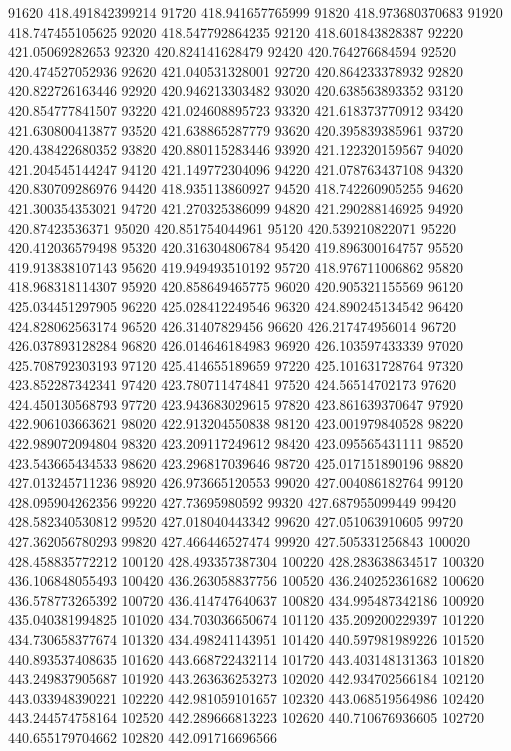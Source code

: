 {91620 418.491842399214
91720 418.941657765999
91820 418.973680370683
91920 418.747455105625
92020 418.547792864235
92120 418.601843828387
92220 421.05069282653
92320 420.824141628479
92420 420.764276684594
92520 420.474527052936
92620 421.040531328001
92720 420.864233378932
92820 420.822726163446
92920 420.946213303482
93020 420.638563893352
93120 420.854777841507
93220 421.024608895723
93320 421.618373770912
93420 421.630800413877
93520 421.638865287779
93620 420.395839385961
93720 420.438422680352
93820 420.880115283446
93920 421.122320159567
94020 421.204545144247
94120 421.149772304096
94220 421.078763437108
94320 420.830709286976
94420 418.935113860927
94520 418.742260905255
94620 421.300354353021
94720 421.270325386099
94820 421.290288146925
94920 420.87423536371
95020 420.851754044961
95120 420.539210822071
95220 420.412036579498
95320 420.316304806784
95420 419.896300164757
95520 419.913838107143
95620 419.949493510192
95720 418.976711006862
95820 418.968318114307
95920 420.858649465775
96020 420.905321155569
96120 425.034451297905
96220 425.028412249546
96320 424.890245134542
96420 424.828062563174
96520 426.31407829456
96620 426.217474956014
96720 426.037893128284
96820 426.014646184983
96920 426.103597433339
97020 425.708792303193
97120 425.414655189659
97220 425.101631728764
97320 423.852287342341
97420 423.780711474841
97520 424.56514702173
97620 424.450130568793
97720 423.943683029615
97820 423.861639370647
97920 422.906103663621
98020 422.913204550838
98120 423.001979840528
98220 422.989072094804
98320 423.209117249612
98420 423.095565431111
98520 423.543665434533
98620 423.296817039646
98720 425.017151890196
98820 427.013245711236
98920 426.973665120553
99020 427.004086182764
99120 428.095904262356
99220 427.73695980592
99320 427.687955099449
99420 428.582340530812
99520 427.018040443342
99620 427.051063910605
99720 427.362056780293
99820 427.466446527474
99920 427.505331256843
100020 428.458835772212
100120 428.493357387304
100220 428.283638634517
100320 436.106848055493
100420 436.263058837756
100520 436.240252361682
100620 436.578773265392
100720 436.414747640637
100820 434.995487342186
100920 435.040381994825
101020 434.703036650674
101120 435.209200229397
101220 434.730658377674
101320 434.498241143951
101420 440.597981989226
101520 440.893537408635
101620 443.668722432114
101720 443.403148131363
101820 443.249837905687
101920 443.263636253273
102020 442.934702566184
102120 443.033948390221
102220 442.981059101657
102320 443.068519564986
102420 443.244574758164
102520 442.289666813223
102620 440.710676936605
102720 440.655179704662
102820 442.091716696566
}
